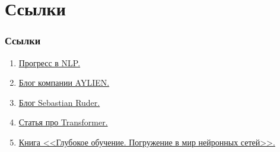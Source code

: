 \section{Ссылки}

\begin{frame}[c]
	\frametitle{Ссылки}
	\begin{enumerate}
		[square]
		\item \href{nlpprogress.com}{Прогресс в NLP.}
		\item \href{blog.aylien.com}{Блог компании AYLIEN.}
		\item \href{ruder.io/}{Блог Sebastian Ruder.}
		\item \href{habr.com/post/341240}{Статья про Transformer.} 
		\item \href{ozon.ru/context/detail/id/142987816}{Книга <<Глубокое обучение. Погружение в мир нейронных сетей>>.}
	\end{enumerate}
\end{frame}
